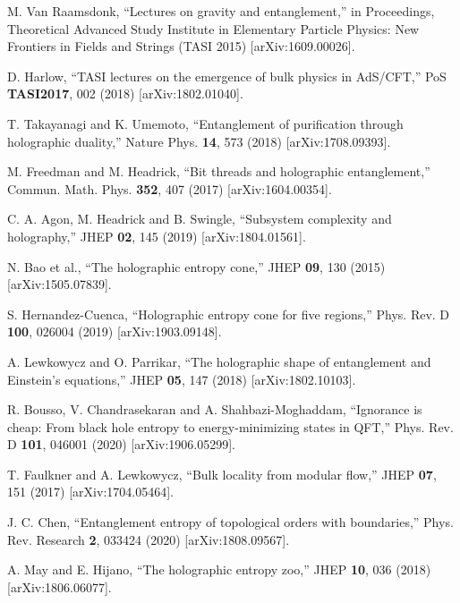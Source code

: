 \documentclass[11pt,letterpaper]{article}
\begin{document}
\begin{thebibliography}{99}
M. Van Raamsdonk, ``Lectures on gravity and entanglement,''
in Proceedings, Theoretical Advanced Study Institute in Elementary Particle Physics: New Frontiers in Fields and Strings (TASI 2015) [arXiv:1609.00026].

D. Harlow, ``TASI lectures on the emergence of bulk physics in AdS/CFT,''
PoS \textbf{TASI2017}, 002 (2018) [arXiv:1802.01040].

T. Takayanagi and K. Umemoto, ``Entanglement of purification through holographic duality,''
Nature Phys. \textbf{14}, 573 (2018) [arXiv:1708.09393].

M. Freedman and M. Headrick, ``Bit threads and holographic entanglement,''
Commun. Math. Phys. \textbf{352}, 407 (2017) [arXiv:1604.00354].

C. A. Agon, M. Headrick and B. Swingle, ``Subsystem complexity and holography,''
JHEP \textbf{02}, 145 (2019) [arXiv:1804.01561].

N. Bao et al., ``The holographic entropy cone,''
JHEP \textbf{09}, 130 (2015) [arXiv:1505.07839].

S. Hernandez-Cuenca, ``Holographic entropy cone for five regions,''
Phys. Rev. D \textbf{100}, 026004 (2019) [arXiv:1903.09148].

A. Lewkowycz and O. Parrikar, ``The holographic shape of entanglement and Einstein's equations,''
JHEP \textbf{05}, 147 (2018) [arXiv:1802.10103].

R. Bousso, V. Chandrasekaran and A. Shahbazi-Moghaddam, ``Ignorance is cheap: From black hole entropy to energy-minimizing states in QFT,''
Phys. Rev. D \textbf{101}, 046001 (2020) [arXiv:1906.05299].

T. Faulkner and A. Lewkowycz, ``Bulk locality from modular flow,''
JHEP \textbf{07}, 151 (2017) [arXiv:1704.05464].

J. C. Chen, ``Entanglement entropy of topological orders with boundaries,''
Phys. Rev. Research \textbf{2}, 033424 (2020) [arXiv:1808.09567].

A. May and E. Hijano, ``The holographic entropy zoo,''
JHEP \textbf{10}, 036 (2018) [arXiv:1806.06077].

\end{thebibliography}
\end{document}
